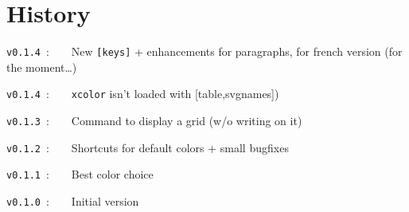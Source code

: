 \documentclass[a4paper]{article}
\begin{document}
\pagebreak

\part*{History}

\verb|v0.1.4|~:~~~~New \texttt{[keys]} + enhancements for paragraphs, for french version (for the moment\dots)

\verb|v0.1.4|~:~~~~\texttt{xcolor} isn't loaded with \textsf{[table,svgnames]})

\verb|v0.1.3|~:~~~~Command to display a grid (w/o writing on it)

\verb|v0.1.2|~:~~~~Shortcuts for default colors + small bugfixes

\verb|v0.1.1|~:~~~~Best color choice

\verb|v0.1.0|~:~~~~Initial version
\end{document}
